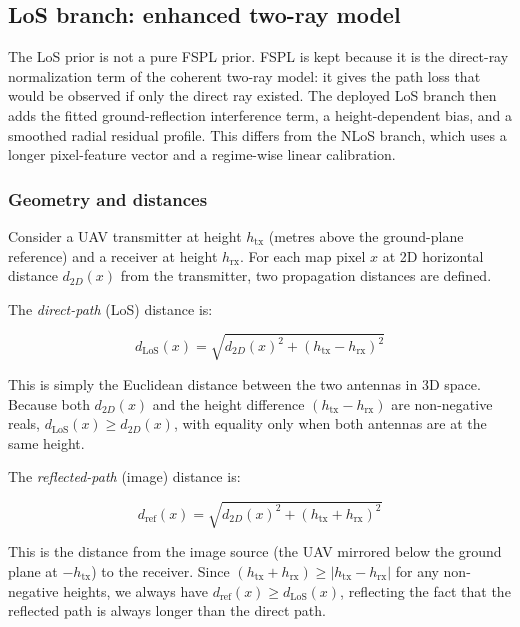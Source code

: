 \subsection{LoS branch: enhanced two-ray model}

The LoS prior is not a pure FSPL prior. FSPL is kept because it is the
direct-ray normalization term of the coherent two-ray model: it gives the
path loss that would be observed if only the direct ray existed. The deployed
LoS branch then adds the fitted ground-reflection interference term,
a height-dependent bias, and a smoothed radial residual profile. This differs
from the NLoS branch, which uses a longer pixel-feature vector and a
regime-wise linear calibration.

\subsubsection{Geometry and distances}

Consider a UAV transmitter at height $h_{\mathrm{tx}}$ (metres above the
ground-plane reference) and a receiver at height $h_{\mathrm{rx}}$. For each
map pixel $x$ at 2D horizontal distance $d_{2D}(x)$ from the transmitter, two
propagation distances are defined.

The \emph{direct-path} (LoS) distance is:

\begin{equation}
d_{\mathrm{LoS}}(x)
=
\sqrt{d_{2D}(x)^2 + (h_{\mathrm{tx}} - h_{\mathrm{rx}})^2}
\label{eq:d_los}
\end{equation}

This is simply the Euclidean distance between the two antennas in 3D space.
Because both $d_{2D}(x)$ and the height difference $(h_{\mathrm{tx}} -
h_{\mathrm{rx}})$ are non-negative reals, $d_{\mathrm{LoS}}(x) \ge
d_{2D}(x)$, with equality only when both antennas are at the same height.

The \emph{reflected-path} (image) distance is:

\begin{equation}
d_{\mathrm{ref}}(x)
=
\sqrt{d_{2D}(x)^2 + (h_{\mathrm{tx}} + h_{\mathrm{rx}})^2}
\label{eq:d_ref}
\end{equation}

This is the distance from the image source (the UAV mirrored below the
ground plane at $-h_{\mathrm{tx}}$) to the receiver. Since $(h_{\mathrm{tx}}
+ h_{\mathrm{rx}}) \ge |h_{\mathrm{tx}} - h_{\mathrm{rx}}|$ for any
non-negative heights, we always have $d_{\mathrm{ref}}(x) \ge
d_{\mathrm{LoS}}(x)$, reflecting the fact that the reflected path is always
longer than the direct path.

